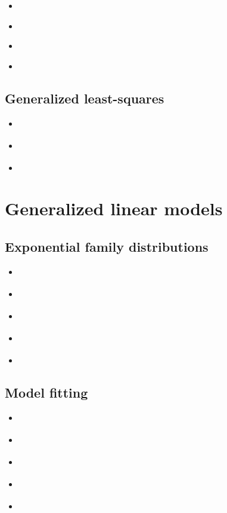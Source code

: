 \documentclass{report}
\begin{document}
\begin{itemize}
    \item \cite[Chapter~11]{faraway_linear_2015}
    \item \cite[Chapter~10.5]{wakefield_bayesian_2013}
    \item \cite[Chapter~3.4]{hastie_elements_2009}
    \item \cite[Chapter~11.1]{agresti_foundations_2015}
\end{itemize}

\subsection{Generalized least-squares}

\begin{itemize}
    \item \cite[Chapter~8.1]{faraway_linear_2015}
    \item \cite[Chapter~2.7.2]{agresti_foundations_2015}
    \item \cite[Chapter~5.6.2]{wakefield_bayesian_2013}
\end{itemize}

\section{Generalized linear models}\label{sec:reading-glm}

\subsection{Exponential family distributions}

\begin{itemize}
    \item \cite[Chapter~3.2]{dobson_introduction_2018}
    \item \cite[Chapter~8.1]{faraway_extending_2016}
    \item \cite[Chapter~4.1]{agresti_foundations_2015}
    \item \cite[Chapter~2.3]{hardin_generalized_2018}
    \item \cite[Chapter~5.3]{dunn_generalized_2018}
\end{itemize}

\subsection{Model fitting}

\begin{itemize}
    \item \cite[Chapter~8.2]{faraway_extending_2016}
    \item \cite[Chapter~2]{dobson_introduction_2018}
    \item \cite[Chapter~4.5]{agresti_foundations_2015}
    \item \cite[Chapter~3]{hardin_generalized_2018}
    \item \cite[Chapter~6]{dunn_generalized_2018}
\end{itemize}
\end{document}
